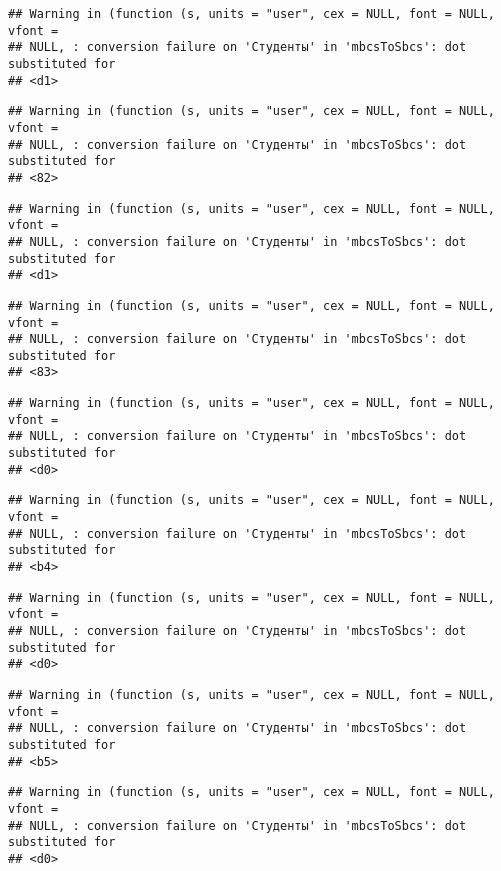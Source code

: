 \documentclass[
]{article}
\begin{document}
\begin{verbatim}
## Warning in (function (s, units = "user", cex = NULL, font = NULL, vfont =
## NULL, : conversion failure on 'Студенты' in 'mbcsToSbcs': dot substituted for
## <d1>
\end{verbatim}

\begin{verbatim}
## Warning in (function (s, units = "user", cex = NULL, font = NULL, vfont =
## NULL, : conversion failure on 'Студенты' in 'mbcsToSbcs': dot substituted for
## <82>
\end{verbatim}

\begin{verbatim}
## Warning in (function (s, units = "user", cex = NULL, font = NULL, vfont =
## NULL, : conversion failure on 'Студенты' in 'mbcsToSbcs': dot substituted for
## <d1>
\end{verbatim}

\begin{verbatim}
## Warning in (function (s, units = "user", cex = NULL, font = NULL, vfont =
## NULL, : conversion failure on 'Студенты' in 'mbcsToSbcs': dot substituted for
## <83>
\end{verbatim}

\begin{verbatim}
## Warning in (function (s, units = "user", cex = NULL, font = NULL, vfont =
## NULL, : conversion failure on 'Студенты' in 'mbcsToSbcs': dot substituted for
## <d0>
\end{verbatim}

\begin{verbatim}
## Warning in (function (s, units = "user", cex = NULL, font = NULL, vfont =
## NULL, : conversion failure on 'Студенты' in 'mbcsToSbcs': dot substituted for
## <b4>
\end{verbatim}

\begin{verbatim}
## Warning in (function (s, units = "user", cex = NULL, font = NULL, vfont =
## NULL, : conversion failure on 'Студенты' in 'mbcsToSbcs': dot substituted for
## <d0>
\end{verbatim}

\begin{verbatim}
## Warning in (function (s, units = "user", cex = NULL, font = NULL, vfont =
## NULL, : conversion failure on 'Студенты' in 'mbcsToSbcs': dot substituted for
## <b5>
\end{verbatim}

\begin{verbatim}
## Warning in (function (s, units = "user", cex = NULL, font = NULL, vfont =
## NULL, : conversion failure on 'Студенты' in 'mbcsToSbcs': dot substituted for
## <d0>
\end{verbatim}
\end{document}
